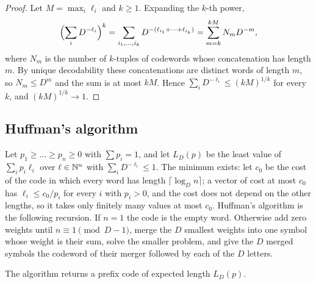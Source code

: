 \begin{proof}
Let $M=\max_{i}\ell_{i}$ and $k\ge1$. Expanding the $k$-th power,
\[
\Bigl(\sum_{i}D^{-\ell_{i}}\Bigr)^{k}=\sum_{i_{1},\dots,i_{k}}D^{-(\ell_{i_{1}}+\dots+\ell_{i_{k}})}=\sum_{m=k}^{kM}N_{m}D^{-m},
\]
where $N_{m}$ is the number of $k$-tuples of codewords whose concatenation has length $m$. By unique decodability these concatenations are distinct words of length $m$, so $N_{m}\le D^{m}$ and the sum is at most $kM$. Hence $\sum_{i}D^{-\ell_{i}}\le(kM)^{1/k}$ for every $k$, and $(kM)^{1/k}\to1$.
\end{proof}

\subsection{Huffman's algorithm}\label{app:huffman}

Let $p_{1}\ge\dots\ge p_{n}\ge0$ with $\sum p_{i}=1$, and let $L_{D}(p)$ be the least value of $\sum_{i}p_{i}\ell_{i}$ over $\ell\in\mathbb{N}^{n}$ with $\sum_{i}D^{-\ell_{i}}\le1$. The minimum exists: let $c_{0}$ be the cost of the code in which every word has length $\lceil\log_{D}n\rceil$; a vector of cost at most $c_{0}$ has $\ell_{i}\le c_{0}/p_{i}$ for every $i$ with $p_{i}>0$, and the cost does not depend on the other lengths, so it takes only finitely many values at most $c_{0}$. Huffman's algorithm \cite{Huf52} is the following recursion. If $n=1$ the code is the empty word. Otherwise add zero weights until $n\equiv1\pmod{D-1}$, merge the $D$ smallest weights into one symbol whose weight is their sum, solve the smaller problem, and give the $D$ merged symbols the codeword of their merger followed by each of the $D$ letters.

\begin{proposition}[Huffman]
The algorithm returns a prefix code of expected length $L_{D}(p)$.
\end{proposition}

